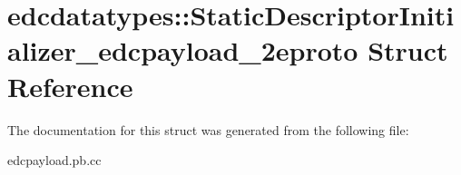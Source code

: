 \hypertarget{structedcdatatypes_1_1_static_descriptor_initializer__edcpayload__2eproto}{\section{edcdatatypes\-:\-:Static\-Descriptor\-Initializer\-\_\-edcpayload\-\_\-2eproto Struct Reference}
\label{structedcdatatypes_1_1_static_descriptor_initializer__edcpayload__2eproto}
}


The documentation for this struct was generated from the following file\-:\begin{DoxyCompactItemize}
\item 
edcpayload.\-pb.\-cc\end{DoxyCompactItemize}
